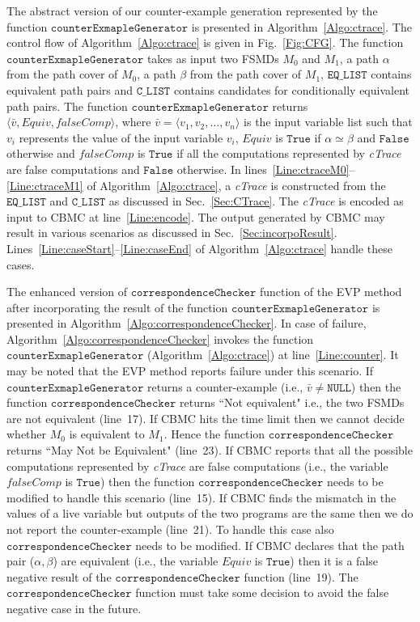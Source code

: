 The abstract version of our counter-example generation  represented by the
function $\mathtt{counterExmapleGenerator}$ is presented in Algorithm~\ref{Algo:ctrace}.  The control flow of
Algorithm~\ref{Algo:ctrace} is given in Fig.~\ref{Fig:CFG}.
The function $\mathtt{counterExmapleGenerator}$ takes as input two FSMDs $M_0$ and $M_1$, a
path $\alpha$ from the path cover of $M_0$, a  path $\beta$ from the path cover of
$M_1$, $\mathtt{EQ\_LIST}$ contains equivalent path pairs and
$\mathtt{C\_LIST}$ contains candidates for conditionally equivalent path pairs.
The function $\mathtt{counterExmapleGenerator}$ returns
$\langle\bar{v},\mathit{Equiv},\mathit{falseComp}\rangle$, where $\bar{v}=\langle
v_1,v_2,\dots,v_n\rangle$ is the input variable list such  that $v_i$ represents the
value of the input variable $v_i$, $\mathit{Equiv}$ is
$\mathtt{True}$ if $\alpha\simeq\beta$ and $\mathtt{False}$ otherwise and 
$\mathit{falseComp}$ is $\mathtt{True}$ if all the
computations represented by \textit{cTrace} are false computations and 
$\mathtt{False}$ otherwise. In lines~\ref{Line:ctraceM0}--\ref{Line:ctraceM1} of
Algorithm~\ref{Algo:ctrace}, a \textit{cTrace} is constructed from the
$\mathtt{EQ\_LIST}$ and $\mathtt{C\_LIST}$ as discussed in Sec.~\ref{Sec:CTrace}. The
\textit{cTrace} is encoded as input to CBMC at line~\ref{Line:encode}. The
output generated by CBMC may result in various scenarios as discussed in
Sec.~\ref{Sec:incorpoResult}.  Lines~\ref{Line:caseStart}--\ref{Line:caseEnd}
of Algorithm~\ref{Algo:ctrace} handle  these cases.

The enhanced version of $\mathtt{correspondenceChecker}$ function of the EVP method \cite{Chouksey18} after incorporating
 the result of the function $\mathtt{counterExmapleGenerator}$ is presented in 
Algorithm~\ref{Algo:correspondenceChecker}. In case of failure,
Algorithm~\ref{Algo:correspondenceChecker} invokes the function
$\mathtt{counterExmapleGenerator}$ (Algorithm~\ref{Algo:ctrace}) at
line~\ref{Line:counter}. It may be noted that the EVP method reports failure under this scenario.
  If $\mathtt{counterExmapleGenerator}$
returns a counter-example (i.e., $\bar{v}\neq \mathtt{NULL}$) then the function
$\mathtt{correspondenceChecker}$ returns ``Not equivalent" i.e., the two FSMDs are
not equivalent (line~17). If CBMC hits the time limit then  we
cannot decide whether $M_0$ is equivalent to  $M_1$. Hence the function
$\mathtt{correspondenceChecker}$ returns ``May Not be Equivalent" (line~23). If
CBMC reports that all the possible computations represented by \textit{cTrace}
are false computations (i.e., the variable $\mathit{falseComp}$ is
$\mathtt{True}$) then the function $\mathtt{correspondenceChecker}$ needs to be
modified to handle this scenario (line~15). 
If CBMC finds the mismatch in the values of a live variable but outputs of the
two programs are the same then we do not report the counter-example (line~21). To handle this 
case also $\mathtt{correspondenceChecker}$ needs to be modified. 
If CBMC declares that the path pair
($\alpha,\beta$) are equivalent (i.e., the variable $\mathit{Equiv}$ is
$\mathtt{True}$) then it is a false negative result of the
$\mathtt{correspondenceChecker}$ function (line~19). The
$\mathtt{correspondenceChecker}$ function must take some decision to avoid the
false negative case in the future.
